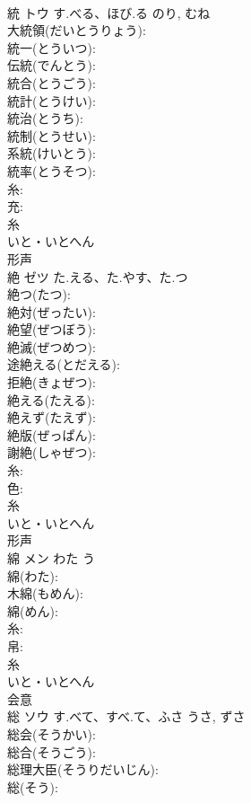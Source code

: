 \documentclass[8pt]{extreport}
\begin{document}
\begin{CJK}{UTF8}{min}
\\	統	トウ	す.べる、ほび.る	のり, むね	
\\	大統領(だいとうりょう): 
\\	統一(とういつ): 
\\	伝統(でんとう): 
\\	統合(とうごう): 
\\	統計(とうけい): 
\\	統治(とうち): 
\\	統制(とうせい): 
\\	系統(けいとう): 
\\	統率(とうそつ): 
\\	糸: 
\\	充: 
\\	糸	
\\	いと・いとへん	
\\	形声 
\\	絶	ゼツ	た.える、た.やす、た.つ		
\\	絶つ(たつ): 
\\	絶対(ぜったい): 
\\	絶望(ぜつぼう): 
\\	絶滅(ぜつめつ): 
\\	途絶える(とだえる): 
\\	拒絶(きょぜつ): 
\\	絶える(たえる): 
\\	絶えず(たえず): 
\\	絶版(ぜっぱん): 
\\	謝絶(しゃぜつ): 
\\	糸: 
\\	色: 
\\	糸	
\\	いと・いとへん	
\\	形声 
\\	綿	メン	わた	う	
\\	綿(わた): 
\\	木綿(もめん): 
\\	綿(めん): 
\\	糸: 
\\	帛: 
\\	糸	
\\	いと・いとへん	
\\	会意 
\\	総	ソウ	す.べて、すべ.て、ふさ	うさ, ずさ	
\\	総会(そうかい): 
\\	総合(そうごう): 
\\	総理大臣(そうりだいじん): 
\\	総(そう): 

\end{CJK}
\end{document}

